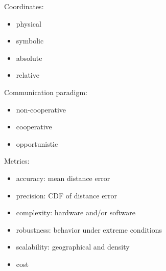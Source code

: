 \documentclass[a4paper,12pt]{article}
\begin{document}
Coordinates:
\begin{itemize}
  \item physical
  \item symbolic
  \item absolute
  \item relative
\end{itemize}

Communication paradigm:
\begin{itemize}
  \item non-cooperative
  \item cooperative
  \item opportunistic
\end{itemize}

Metrics:
\begin{itemize}
  \item accuracy: mean distance error
  \item precision: CDF of distance error
  \item complexity: hardware and/or software
  \item robustness: behavior under extreme conditions
  \item scalability: geographical and density
  \item cost
\end{itemize}
\end{document}
